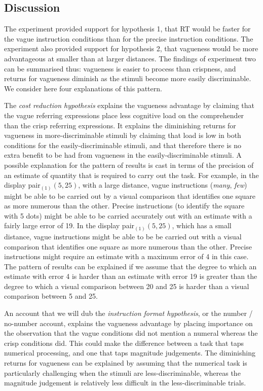 \documentclass[doc,floatmark]{apa}
\begin{document}
\subsection{Discussion}

The experiment provided support for hypothesis 1, that RT would be faster for the vague instruction conditions than for the precise instruction conditions. The experiment also provided support for hypothesis 2, that  vagueness would be more advantageous at smaller than at larger distances.  The findings of experiment two can be summarised thus: vagueness is easier to process than crispness, and returns for vagueness diminish as the stimuli become more easily discriminable. We consider here four explanations of this pattern.

\begin{seriate}
\item The \emph{cost reduction hypothesis} explains the vagueness advantage by claiming that the vague referring expressions place less cognitive load on the comprehender than the crisp referring expressions. It explains the diminishing returns for vagueness in more-discriminable stimuli by claiming that load is low in both conditions for the easily-discriminable stimuli, and that therefore there is no extra benefit to be had from vagueness in the easily-discriminable stimuli. A possible explanation for the pattern of results is cast in terms of the precision of an estimate of quantity that is required to carry out the task. For example, in the display pair$_{(1)}(5, 25)$, with a large distance, vague instructions (\emph{many}, \emph{few}) might be able to  be carried out by a visual comparison that identifies one square as more numerous than the other. Precise instructions (to identify the square with 5 dots) might be able to be carried accurately out with an estimate with a fairly large error of 19. In the display pair$_{(1)}(5, 25)$, which has a small distance, vague instructions might be able to be be carried out with a visual comparison that identifies one square as more numerous than the other. Precise instructions might require an estimate with a maximum error of 4 in this case. The pattern of results can be explained if we assume that the degree to which an estimate with error 4 is harder than an estimate with error 19 is greater than the degree to which a visual comparison between 20 and 25 is harder than a visual comparison between 5 and 25.

\item An account that we will dub the \emph{instruction format hypothesis}, or the number / no-number account, explains the vagueness advantage by placing importance on the observation that the vague conditions did not mention a numeral whereas the crisp conditions did. This could make the difference between a task that taps numerical processing, and one that taps magnitude judgements. The diminishing returns for vagueness can be explained by assuming that the numerical task is particularly challenging when the stimuli are less-discriminable, whereas the magnitude judgement is relatively less difficult in the less-discriminable trials. 


\end{seriate}
\end{document}
